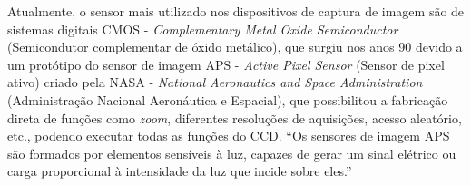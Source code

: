 Atualmente, o sensor mais utilizado nos dispositivos de captura de imagem são de sistemas digitais CMOS - \textit{Complementary Metal Oxide Semiconductor} (Semicondutor complementar de óxido metálico), que surgiu nos anos 90 devido a um protótipo do sensor de imagem APS - \textit{Active Pixel Sensor} (Sensor de pixel ativo) criado pela NASA - \textit{National Aeronautics and Space Administration} (Administração Nacional Aeronáutica e Espacial), que possibilitou a fabricação direta de funções como \textit{zoom}, diferentes resoluções de aquisições, acesso aleatório, etc., podendo executar todas as funções do CCD. “Os sensores de imagem APS são formados por elementos sensíveis à luz, capazes de gerar um sinal elétrico ou carga proporcional à intensidade da luz que incide sobre eles.” \cite{CHMIELEWSKI2009}